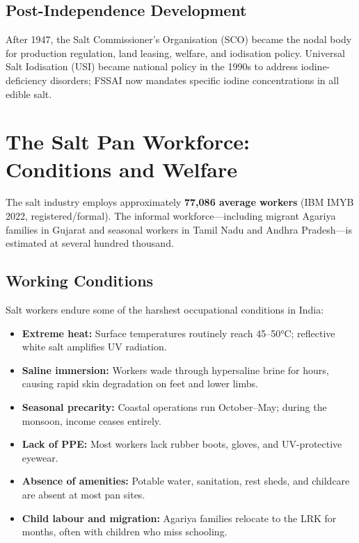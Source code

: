 \documentclass[12pt,a4paper]{article}
\begin{document}
\subsection{Post-Independence Development}

After 1947, the Salt Commissioner's Organisation (SCO) became the nodal body for
production regulation, land leasing, welfare, and iodisation policy. Universal Salt
Iodisation (USI) became national policy in the 1990s to address iodine-deficiency
disorders; FSSAI now mandates specific iodine concentrations in all edible salt.

\section{The Salt Pan Workforce: Conditions and Welfare}

The salt industry employs approximately \textbf{77,086 average workers} (IBM IMYB 2022,
registered/formal). The informal workforce—including migrant Agariya families in Gujarat
and seasonal workers in Tamil Nadu and Andhra Pradesh—is estimated at several hundred
thousand.

\subsection{Working Conditions}

Salt workers endure some of the harshest occupational conditions in India:

\begin{itemize}[leftmargin=*, nosep]
  \item \textbf{Extreme heat:} Surface temperatures routinely reach 45--50°C;
        reflective white salt amplifies UV radiation.
  \item \textbf{Saline immersion:} Workers wade through hypersaline brine for hours,
        causing rapid skin degradation on feet and lower limbs.
  \item \textbf{Seasonal precarity:} Coastal operations run October--May; during the
        monsoon, income ceases entirely.
  \item \textbf{Lack of PPE:} Most workers lack rubber boots, gloves, and UV-protective
        eyewear.
  \item \textbf{Absence of amenities:} Potable water, sanitation, rest sheds, and
        childcare are absent at most pan sites.
  \item \textbf{Child labour and migration:} Agariya families relocate to the LRK for
        months, often with children who miss schooling.
\end{itemize}
\end{document}
